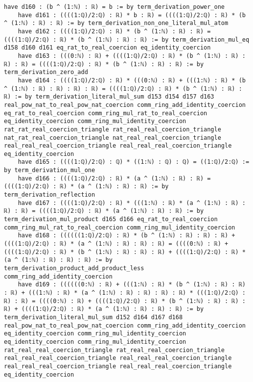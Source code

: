 \documentclass{article}
\begin{document}
\begin{tcolorbox}[colback=white!10, width=\linewidth]
\begin{lstlisting}[language=Lean4]
    have d160 : (b ^ (1:ℕ) : ℝ) = b := by term_derivation_power_one
    have d161 : ((((1:ℚ)/2:ℚ) : ℝ) * b : ℝ) = ((((1:ℚ)/2:ℚ) : ℝ) * (b ^ (1:ℕ) : ℝ) : ℝ) := by term_derivation_non_one_literal_mul_atom
    have d162 : ((((1:ℚ)/2:ℚ) : ℝ) * (b ^ (1:ℕ) : ℝ) : ℝ) = ((((1:ℚ)/2:ℚ) : ℝ) * (b ^ (1:ℕ) : ℝ) : ℝ) := by term_derivation_mul_eq d158 d160 d161 eq_rat_to_real_coercion eq_identity_coercion
    have d163 : (((0:ℕ) : ℝ) + ((((1:ℚ)/2:ℚ) : ℝ) * (b ^ (1:ℕ) : ℝ) : ℝ) : ℝ) = ((((1:ℚ)/2:ℚ) : ℝ) * (b ^ (1:ℕ) : ℝ) : ℝ) := by term_derivation_zero_add
    have d164 : ((((1:ℚ)/2:ℚ) : ℝ) * (((0:ℕ) : ℝ) + (((1:ℕ) : ℝ) * (b ^ (1:ℕ) : ℝ) : ℝ) : ℝ) : ℝ) = ((((1:ℚ)/2:ℚ) : ℝ) * (b ^ (1:ℕ) : ℝ) : ℝ) := by term_derivation_literal_mul_sum d153 d154 d157 d163 real_pow_nat_to_real_pow_nat_coercion comm_ring_add_identity_coercion eq_rat_to_real_coercion comm_ring_mul_rat_to_real_coercion eq_identity_coercion comm_ring_mul_identity_coercion rat_rat_real_coercion_triangle rat_real_real_coercion_triangle nat_rat_real_coercion_triangle nat_real_real_coercion_triangle real_real_real_coercion_triangle real_real_real_coercion_triangle eq_identity_coercion
    have d165 : ((((1:ℚ)/2:ℚ) : ℚ) * ((1:ℕ) : ℚ) : ℚ) = ((1:ℚ)/2:ℚ) := by term_derivation_mul_one
    have d166 : ((((1:ℚ)/2:ℚ) : ℝ) * (a ^ (1:ℕ) : ℝ) : ℝ) = ((((1:ℚ)/2:ℚ) : ℝ) * (a ^ (1:ℕ) : ℝ) : ℝ) := by term_derivation_reflection
    have d167 : ((((1:ℚ)/2:ℚ) : ℝ) * (((1:ℕ) : ℝ) * (a ^ (1:ℕ) : ℝ) : ℝ) : ℝ) = ((((1:ℚ)/2:ℚ) : ℝ) * (a ^ (1:ℕ) : ℝ) : ℝ) := by term_derivation_mul_product d165 d166 eq_rat_to_real_coercion comm_ring_mul_rat_to_real_coercion comm_ring_mul_identity_coercion
    have d168 : ((((((1:ℚ)/2:ℚ) : ℝ) * (b ^ (1:ℕ) : ℝ) : ℝ) : ℝ) + ((((1:ℚ)/2:ℚ) : ℝ) * (a ^ (1:ℕ) : ℝ) : ℝ) : ℝ) = ((((0:ℕ) : ℝ) + ((((1:ℚ)/2:ℚ) : ℝ) * (b ^ (1:ℕ) : ℝ) : ℝ) : ℝ) + ((((1:ℚ)/2:ℚ) : ℝ) * (a ^ (1:ℕ) : ℝ) : ℝ) : ℝ) := by term_derivation_product_add_product_less comm_ring_add_identity_coercion
    have d169 : ((((((0:ℕ) : ℝ) + (((1:ℕ) : ℝ) * (b ^ (1:ℕ) : ℝ) : ℝ) : ℝ) + (((1:ℕ) : ℝ) * (a ^ (1:ℕ) : ℝ) : ℝ) : ℝ) : ℝ) * (((1:ℚ)/2:ℚ) : ℝ) : ℝ) = ((((0:ℕ) : ℝ) + ((((1:ℚ)/2:ℚ) : ℝ) * (b ^ (1:ℕ) : ℝ) : ℝ) : ℝ) + ((((1:ℚ)/2:ℚ) : ℝ) * (a ^ (1:ℕ) : ℝ) : ℝ) : ℝ) := by term_derivation_literal_mul_sum d152 d164 d167 d168 real_pow_nat_to_real_pow_nat_coercion comm_ring_add_identity_coercion eq_identity_coercion comm_ring_mul_identity_coercion eq_identity_coercion comm_ring_mul_identity_coercion rat_real_real_coercion_triangle rat_real_real_coercion_triangle real_real_real_coercion_triangle real_real_real_coercion_triangle real_real_real_coercion_triangle real_real_real_coercion_triangle eq_identity_coercion

\end{lstlisting}
\end{tcolorbox}
\end{document}
